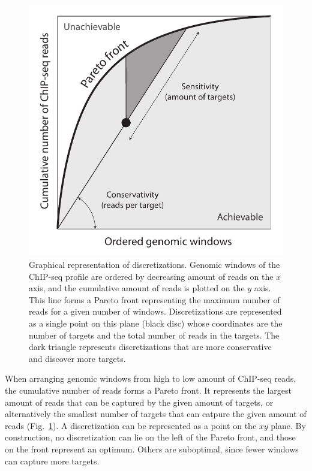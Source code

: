 \documentclass{bioinfo}
\begin{document}
\begin{figure}[!tpb]
\centerline{\includegraphics[scale=0.5]{pareto_front_explanation.pdf}}
\caption{
  Graphical representation of discretizations. Genomic
  windows of the ChIP-seq profile are ordered by decreasing amount of
  reads on the $x$ axis, and the cumulative amount of reads is plotted
  on the $y$ axis. This line forms a Pareto front representing the
  maximum number of reads for a given number of windows. Discretizations
  are represented as a single point on this plane (black disc) whose
  coordinates are the number of targets and the total number of reads
  in the targets. The dark triangle represents discretizations that
  are more conservative and discover more targets.
}
\label{fig:expl}
\end{figure}

When arranging genomic windows from high to low amount of ChIP-seq
reads, the cumulative number of reads forms a Pareto front.
It represents the largest amount of reads that can be captured by the
given amount of targets, or alternatively the smallest number of
targets that can catpure the given amount of reads
(Fig.~\ref{fig:expl}). A discretization can be represented as a point
on the $xy$ plane.  By construction, no discretization can lie on the
left of the Pareto front, and those on the front represent an
optimum. Others are suboptimal, since fewer windows can capture more
targets.
\end{document}
